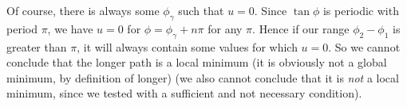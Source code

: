 \documentclass[a4paper]{article}
\begin{document}
\begin{eg}
  Of course, there is always some $\phi_\gamma$ such that $u = 0$. Since $\tan \phi$ is periodic with period $\pi$, we have $u = 0$ for $\phi = \phi_\gamma + n\pi$ for any $\pi$. Hence if our range $\phi_2 - \phi_1$ is greater than $\pi$, it will always contain some values for which $u = 0$. So we cannot conclude that the longer path is a local minimum (it is obviously not a global minimum, by definition of longer) (we also cannot conclude that it is \emph{not} a local minimum, since we tested with a sufficient and not necessary condition).
\end{eg}
\end{document}
